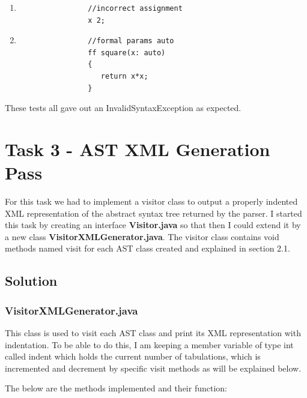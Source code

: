 \documentclass{article}
\begin{document}
\begin{enumerate}
				\item 
				\begin{lstlisting}
				//incorrect assignment
				x 2;
				\end{lstlisting}
				
					\item 
				\begin{lstlisting}
				//formal params auto
				ff square(x: auto)
				{
			 	   return x*x;
				}
				\end{lstlisting}
				
				
				
				\end{enumerate}
				
				These tests all gave out an InvalidSyntaxException as expected.
				
				
			
				\section{Task 3 - AST XML Generation Pass}
				
				For this task we had to implement a visitor class to output a properly indented XML representation of the abstract syntax tree returned by the parser. I started this task by creating an interface \textbf{Visitor.java} so that then I could extend it by a new class \textbf{VisitorXMLGenerator.java}. The visitor class contains void methods named visit for each AST class created and explained in section 2.1.
				
				\subsection{Solution}
				\subsubsection{VisitorXMLGenerator.java}
				This class is used to visit each AST class and print its XML representation with indentation. To be able to do this, I am keeping a member variable of type int called indent which holds the current number of tabulations, which is incremented and decrement by specific visit methods as will be explained below.
				
				The below are the methods implemented and their function:
				
\end{document}
